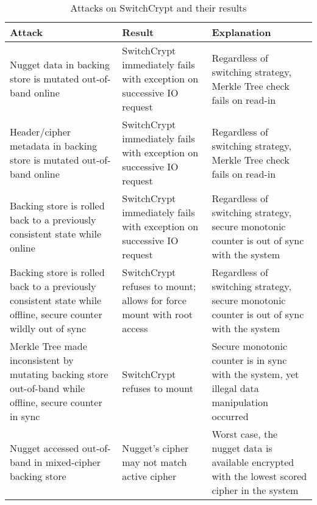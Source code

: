 \begin{table}[t]
  \caption{Attacks on SwitchCrypt and their results} \label{tbl:sc-security}
  \footnotesize
  \centering
  \begin{tabu} to \linewidth { | X[l] | X[c] | X[c] | }
    \hline
    \textbf{Attack} & \textbf{Result} & \textbf{Explanation} \\
    \hline\hline
    Nugget data in backing store is mutated out-of-band online &
    SwitchCrypt immediately fails with exception on successive IO request &
    Regardless of switching strategy, Merkle Tree check fails on read-in\\
    \hline
    Header/cipher metadata in backing store is mutated out-of-band online &
    SwitchCrypt immediately fails with exception on successive IO request &
    Regardless of switching strategy, Merkle Tree check fails on read-in\\
    \hline
    Backing store is rolled back to a previously consistent state while online &
    SwitchCrypt immediately fails with exception on successive IO request &
    Regardless of switching strategy, secure monotonic counter is out of sync
    with the system\\
    \hline
    Backing store is rolled back to a previously consistent state while offline,
    secure counter wildly out of sync & SwitchCrypt refuses to mount; allows for
    force mount with root access & Regardless of switching strategy, secure
    monotonic counter is out of sync with the system\\
    \hline
    Merkle Tree made inconsistent by mutating backing store out-of-band while
    offline, secure counter in sync & SwitchCrypt refuses to mount & Secure
    monotonic counter is in sync with the system, yet illegal data manipulation
    occurred\\
    \hline
    Nugget accessed out-of-band in mixed-cipher backing store & Nugget's cipher
    may not match active cipher & Worst case, the nugget data is available
    encrypted with the lowest scored cipher in the system\\
    \hline\hline
  \end{tabu}
\end{table}
